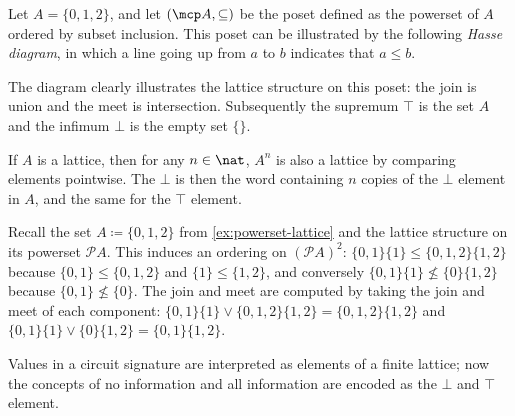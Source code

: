 \begin{example}\label{ex:powerset-lattice}
    Let \(A = \{0,1,2\}\), and let \((\mcp A, \subseteq)\) be the poset defined
    as the powerset of \(A\) ordered by subset inclusion.
    This poset can be illustrated by the following \emph{Hasse diagram}, in
    which a line going up from \(a\) to \(b\) indicates that \(a \leq b\).

    \begin{center}
    \end{center}

    The diagram clearly illustrates the lattice structure on this poset: the
    join is union and the meet is intersection.
    Subsequently the supremum \(\top\) is the set \(A\) and the
    infimum \(\bot\) is the empty set \(\{\}\).
\end{example}

\begin{remark}
    If \(A\) is a lattice, then for any \(n \in \nat\), \(A^n\) is also a
    lattice by comparing elements pointwise.
    The \(\bot\) is then the word containing \(n\) copies of the \(\bot\)
    element in \(A\), and the same for the \(\top\) element.

    Recall the set \(A \coloneqq \{0,1,2\}\) from
    \cref{ex:powerset-lattice} and the lattice structure on its powerset
    \(\mathcal{P}A\).
    This induces an ordering on \((\mathcal{P}A)^2\):
    \(\{0,1\}\{1\} \leq \{0,1,2\}\{1,2\}\) because \(\{0,1\} \leq \{0,1,2\}\)
    and \(\{1\} \leq \{1,2\}\), and conversely
    \(\{0,1\}\{1\} \not\leq \{0\}\{1,2\}\) because \(\{0,1\} \not\leq \{0\}\).
    The join and meet are computed by taking the join and meet of each
    component: \(
    \{0,1\}\{1\} \vee \{0,1,2\}\{1,2\} = \{0,1,2\}\{1,2\}
    \) and \(
    \{0,1\}\{1\} \vee \{0\}\{1,2\} = \{0,1\}\{1,2\}
    \).
\end{remark}

Values in a circuit signature are interpreted as elements of a finite
lattice; now the concepts of no information and all information are encoded
as the \(\bot\) and \(\top\) element.

